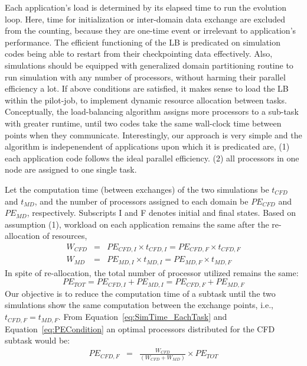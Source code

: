 \documentclass[conference,final]{IEEEtran}
\newcommand{\jhanote}[1]{ {\textcolor{red} { ***Jha: #1 }}}
\newcommand{\jhanote}[1]{}
\begin{document}

Each application's load is determined by its elapsed time to run the
evolution loop. Here, time for initialization or inter-domain data
exchange are excluded from the counting, because they are one-time
event or irrelevant to application's performance.  The efficient
functioning of the LB is predicated on simulation codes being able to
restart from their checkpointing data effectively.  Also, simulations
should be equipped with generalized domain partitioning routine to run
simulation with any number of processors, without harming their
parallel efficiency a lot. If above conditions are satisfied, it makes
sense to load the LB within the pilot-job, to implement dynamic
resource allocation between tasks.  Conceptually, the load-balancing
algorithm assigns more processors to a sub-task with greater runtime,
until two codes take the same wall-clock time between points when they
communicate. Interestingly, our approach is very simple and the
algorithm is indepenendent of applications upon which it is predicated
are, (1) each application code follows the ideal parallel efficiency.
(2) all processors in one node are assigned to one single task.

Let the computation time (between exchanges) of the two simulations
be $t_{CFD}$ and $t_{MD}$, and the number of processors assigned to
each domain be $PE_{CFD}$ and $PE_{MD}$, respectively. Subscripts I and F denotes initial and final states. Based on
assumption (1), workload on each application remains the same after
the re-allocation of resources, 
\begin{eqnarray}
W_{CFD} &=& PE_{CFD,I} \times t_{CFD,I} = PE_{CFD,F} \times t_{CFD,F} \nonumber \\
W_{MD} &=& PE_{MD,I} \times t_{MD,I} = PE_{MD,F} \times t_{MD,F}
\label{eq:SimTime_EachTask}
\end{eqnarray}
In spite
of re-allocation, the total number of processor utilized remains the
same:
\begin{equation}
PE_{TOT} = PE_{CFD,I} + PE_{MD,I} = PE_{CFD,F} + PE_{MD,F}
\label{eq:PECondition}
\end{equation}
Our objective is to reduce the computation time of a subtask until the
two simulations show the same computation between the exchange points, i.e., $t_{CFD,F} = t_{MD,F}$. From
Equation~\ref{eq:SimTime_EachTask} and Equation~\ref{eq:PECondition}
an optimal processors distributed for the CFD subtask would be:
\begin{eqnarray}
PE_{CFD,F} & = & \frac {W_{CFD}} {(W_{CFD} + W_{MD})} \times PE_{TOT}
\end{eqnarray}
\end{document}
